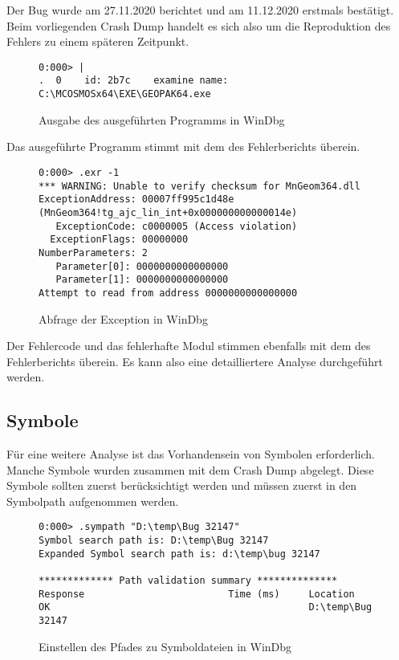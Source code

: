 Der Bug wurde am 27.11.2020 berichtet und am 11.12.2020 erstmals bestätigt. Beim vorliegenden Crash Dump handelt es sich also um die Reproduktion des Fehlers zu einem späteren Zeitpunkt.

\begin{figure}[H]
\begin{lstlisting}
0:000> |
.  0	id: 2b7c	examine	name: C:\MCOSMOSx64\EXE\GEOPAK64.exe
\end{lstlisting}
\caption{Ausgabe des ausgeführten Programms in WinDbg}
\end{figure}
Das ausgeführte Programm stimmt mit dem des Fehlerberichts überein.

\begin{figure}[H]
\begin{lstlisting}[language=WinDbg]
0:000> .exr -1
*** WARNING: Unable to verify checksum for MnGeom364.dll
ExceptionAddress: 00007ff995c1d48e (MnGeom364!tg_ajc_lin_int+0x000000000000014e)
   ExceptionCode: c0000005 (Access violation)
  ExceptionFlags: 00000000
NumberParameters: 2
   Parameter[0]: 0000000000000000
   Parameter[1]: 0000000000000000
Attempt to read from address 0000000000000000
\end{lstlisting}
\caption{Abfrage der Exception in WinDbg}
\end{figure}
Der Fehlercode und das fehlerhafte Modul stimmen ebenfalls mit dem des Fehlerberichts überein. Es kann also eine detailliertere Analyse durchgeführt werden.

\subsection{Symbole}
Für eine weitere Analyse ist das Vorhandensein von Symbolen erforderlich. Manche Symbole wurden zusammen mit dem Crash Dump abgelegt.
Diese Symbole sollten zuerst berücksichtigt werden und müssen zuerst in den Symbolpath aufgenommen werden.
\begin{figure}[H]
\begin{lstlisting}[language=WinDbg]
0:000> .sympath "D:\temp\Bug 32147"
Symbol search path is: D:\temp\Bug 32147
Expanded Symbol search path is: d:\temp\bug 32147

************* Path validation summary **************
Response                         Time (ms)     Location
OK                                             D:\temp\Bug 32147
\end{lstlisting}
\caption{Einstellen des Pfades zu Symboldateien in WinDbg}
\end{figure}

